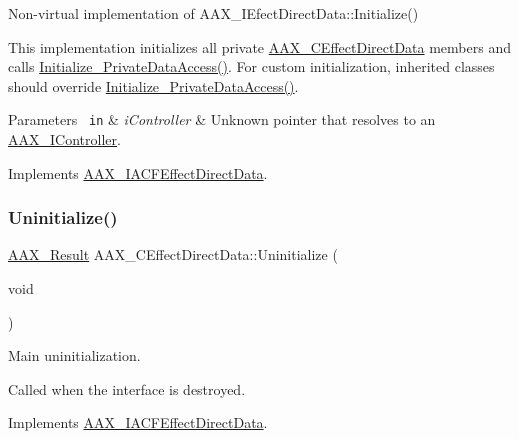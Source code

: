 Non-\/virtual implementation of A\+A\+X\+\_\+\+I\+Efect\+Direct\+Data\+::\+Initialize() 

This implementation initializes all private \mbox{\hyperlink{a01473}{A\+A\+X\+\_\+\+C\+Effect\+Direct\+Data}} members and calls \mbox{\hyperlink{a01473_ac33b9e51d38ffc375df379018abd5899}{Initialize\+\_\+\+Private\+Data\+Access()}}. For custom initialization, inherited classes should override \mbox{\hyperlink{a01473_ac33b9e51d38ffc375df379018abd5899}{Initialize\+\_\+\+Private\+Data\+Access()}}.


\begin{DoxyParams}[1]{Parameters}
\mbox{\texttt{ in}}  & {\em i\+Controller} & Unknown pointer that resolves to an \mbox{\hyperlink{a01789}{A\+A\+X\+\_\+\+I\+Controller}}. \\
\hline
\end{DoxyParams}


Implements \mbox{\hyperlink{a01661_adefbc617c71ea5ea6512fb79a116dbf7}{A\+A\+X\+\_\+\+I\+A\+C\+F\+Effect\+Direct\+Data}}.

\mbox{\label{a01473_a49f02465aa623666f9e43a8646d9e56c}} 
\subsubsection{\texorpdfstring{Uninitialize()}{Uninitialize()}}
{\footnotesize\ttfamily \mbox{\hyperlink{a00392_a4d8f69a697df7f70c3a8e9b8ee130d2f}{A\+A\+X\+\_\+\+Result}} A\+A\+X\+\_\+\+C\+Effect\+Direct\+Data\+::\+Uninitialize (\begin{DoxyParamCaption}\item[{void}]{ }\end{DoxyParamCaption})\hspace{0.3cm}{\ttfamily [virtual]}}



Main uninitialization. 

Called when the interface is destroyed. 

Implements \mbox{\hyperlink{a01661_ad56406a13dd691db6f1117ab97cfc90a}{A\+A\+X\+\_\+\+I\+A\+C\+F\+Effect\+Direct\+Data}}.

\mbox{\label{a01473_a3ed665cfbece195524e208e61b4d1937}} 
